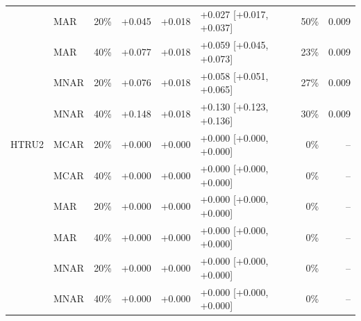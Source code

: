 \begin{tabular}{lllrrlrr}
 & MAR & 20\% & +0.045 & +0.018 & +0.027 [+0.017, +0.037] & 50\% & 0.009 \\
 & MAR & 40\% & +0.077 & +0.018 & +0.059 [+0.045, +0.073] & 23\% & 0.009 \\
 & MNAR & 20\% & +0.076 & +0.018 & +0.058 [+0.051, +0.065] & 27\% & 0.009 \\
 & MNAR & 40\% & +0.148 & +0.018 & +0.130 [+0.123, +0.136] & 30\% & 0.009 \\
\midrule
HTRU2 & MCAR & 20\% & +0.000 & +0.000 & +0.000 [+0.000, +0.000] & 0\% & -- \\
 & MCAR & 40\% & +0.000 & +0.000 & +0.000 [+0.000, +0.000] & 0\% & -- \\
 & MAR & 20\% & +0.000 & +0.000 & +0.000 [+0.000, +0.000] & 0\% & -- \\
 & MAR & 40\% & +0.000 & +0.000 & +0.000 [+0.000, +0.000] & 0\% & -- \\
 & MNAR & 20\% & +0.000 & +0.000 & +0.000 [+0.000, +0.000] & 0\% & -- \\
 & MNAR & 40\% & +0.000 & +0.000 & +0.000 [+0.000, +0.000] & 0\% & -- \\
\bottomrule
\end{tabular}
